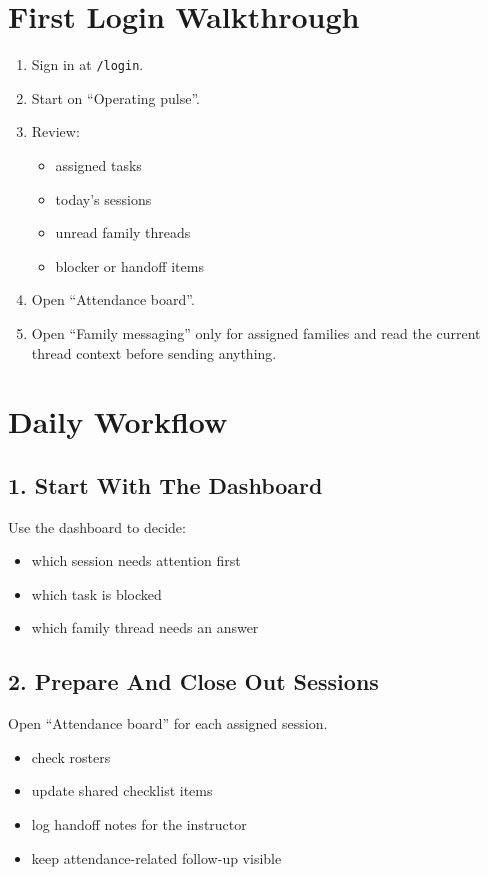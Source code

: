 \documentclass[11pt]{article}
\begin{document}
\section*{First Login Walkthrough}
\begin{enumerate}
  \item Sign in at \texttt{/login}.
  \item Start on ``Operating pulse''.
  \item Review:
  \begin{itemize}
    \item assigned tasks
    \item today’s sessions
    \item unread family threads
    \item blocker or handoff items
  \end{itemize}
  \item Open ``Attendance board''.
  \item Open ``Family messaging'' only for assigned families and read the current thread context before sending anything.
\end{enumerate}

\section*{Daily Workflow}
\subsection*{1. Start With The Dashboard}
Use the dashboard to decide:
\begin{itemize}
  \item which session needs attention first
  \item which task is blocked
  \item which family thread needs an answer
\end{itemize}

\subsection*{2. Prepare And Close Out Sessions}
Open ``Attendance board'' for each assigned session.
\begin{itemize}
  \item check rosters
  \item update shared checklist items
  \item log handoff notes for the instructor
  \item keep attendance-related follow-up visible
\end{itemize}
\end{document}
